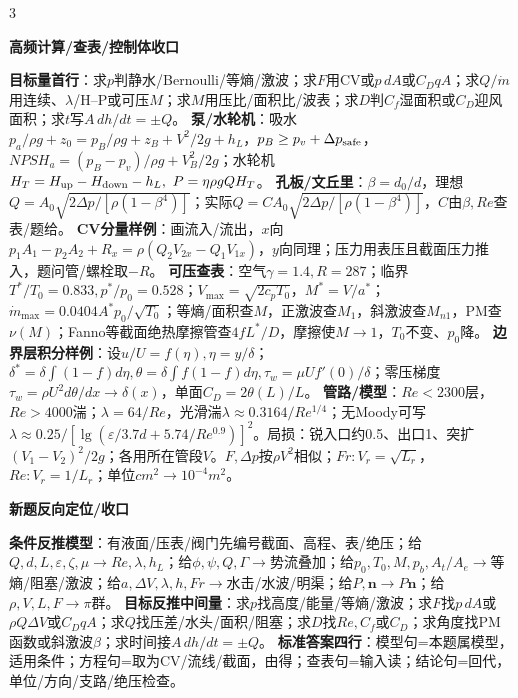 \documentclass[a4paper]{article}
\newcommand{\qt}[1]{\vspace{0.25pt}\colorbox{Q}{\parbox{\dimexpr\linewidth-2\fboxsep}{\color{white}\bfseries #1}}\par}
\newcommand{\sect}[1]{\qt{#1}}
\begin{document}
\begin{multicols}{3}
{\sect{高频计算/查表/控制体收口}
{\fontsize{4.35}{4.45}\selectfont
\textbf{目标量首行}：求$p$判静水/Bernoulli/等熵/激波；求$F$用CV或$p\,dA$或$C_DqA$；求$Q/\dot m$用连续、$\lambda$/H--P或可压$M$；求$M$用压比/面积比/波表；求$D$判$C_f$湿面积或$C_D$迎风面积；求$t$写$A\,dh/dt=\pm Q$。 
\textbf{泵/水轮机}：吸水$p_a/\rho g+z_0=p_B/\rho g+z_B+V^2/2g+h_L$，$p_B\ge p_v+\Delta p_{\rm safe}$，$NPSH_a=(p_B-p_v)/\rho g+V_B^2/2g$；水轮机$H_T=H_{\rm up}-H_{\rm down}-h_L,\ P=\eta\rho gQH_T$。 
\textbf{孔板/文丘里}：$\beta=d_0/d$，理想$Q=A_0\sqrt{2\Delta p/[\rho(1-\beta^4)]}$；实际$Q=C A_0\sqrt{2\Delta p/[\rho(1-\beta^4)]}$，$C$由$\beta,Re$查表/题给。 
\textbf{CV分量样例}：画流入/流出，$x$向$p_1A_1-p_2A_2+R_x=\rho(Q_2V_{2x}-Q_1V_{1x})$，$y$向同理；压力用表压且截面压力推入，题问管/螺栓取$-R$。 
\textbf{可压查表}：空气$\gamma=1.4,R=287$；临界$T^*/T_0=0.833,p^*/p_0=0.528$；$V_{\max}=\sqrt{2c_pT_0}$，$M^*=V/a^*$；$\dot m_{\max}=0.0404A^*p_0/\sqrt{T_0}$；等熵/面积查$M$，正激波查$M_1$，斜激波查$M_{n1}$，PM查$\nu(M)$；Fanno等截面绝热摩擦管查$4fL^*/D$，摩擦使$M\to1$，$T_0$不变、$p_0$降。 
\textbf{边界层积分样例}：设$u/U=f(\eta),\eta=y/\delta$；$\delta^*=\delta\int(1-f)d\eta,\theta=\delta\int f(1-f)d\eta,\tau_w=\mu Uf'(0)/\delta$；零压梯度$\tau_w=\rho U^2d\theta/dx\to\delta(x)$，单面$C_D=2\theta(L)/L$。 
\textbf{管路/模型}：$Re<2300$层，$Re>4000$湍；$\lambda=64/Re$，光滑湍$\lambda\approx0.3164/Re^{1/4}$；无Moody可写$\lambda\approx0.25/[\lg(\varepsilon/3.7d+5.74/Re^{0.9})]^2$。局损：锐入口约0.5、出口1、突扩$(V_1-V_2)^2/2g$；各用所在管段$V$。$F,\Delta p$按$\rho V^2$相似；$Fr:V_r=\sqrt{L_r}$，$Re:V_r=1/L_r$；单位$cm^2\to10^{-4}m^2$。}
\sect{新题反向定位/收口}
{\fontsize{4.43}{4.53}\selectfont
\textbf{条件反推模型}：有液面/压表/阀门先编号截面、高程、表/绝压；给$Q,d,L,\varepsilon,\zeta,\mu\to Re,\lambda,h_L$；给$\phi,\psi,Q,\Gamma\to$势流叠加；给$p_0,T_0,M,p_b,A_t/A_e\to$等熵/阻塞/激波；给$a,\Delta V,\lambda,h,Fr\to$水击/水波/明渠；给$P,\bm n\to P\bm n$；给$\rho,V,L,F\to\pi$群。 
\textbf{目标反推中间量}：求$p$找高度/能量/等熵/激波；求$F$找$p\,dA$或$\rho Q\Delta V$或$C_DqA$；求$Q$找压差/水头/面积/阻塞；求$D$找$Re,C_f$或$C_D$；求角度找PM函数或斜激波$\beta$；求时间接$A\,dh/dt=\pm Q$。 
\textbf{标准答案四行}：模型句=本题属\underline{\hspace{0.45cm}}模型，适用条件\underline{\hspace{0.45cm}}；方程句=取\underline{\hspace{0.4cm}}为CV/流线/截面，由\underline{\hspace{0.55cm}}得；查表句=输入\underline{\hspace{0.45cm}}读\underline{\hspace{0.45cm}}；结论句=回代，单位/方向/支路/绝压检查。 
}}
\end{multicols}
\end{document}
